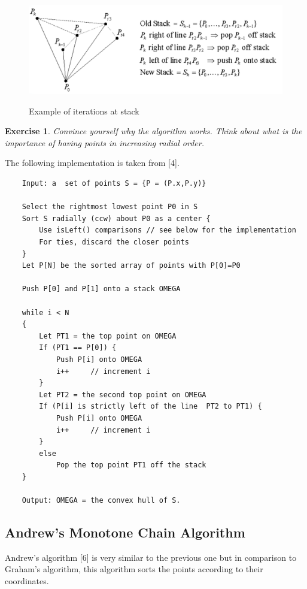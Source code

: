 \documentclass[12pt]{article}
\newtheorem{exercise}{Exercise}[section]
\begin{document}
\begin{center}
  \begin{figure}[!htb]
    \centering
    \includegraphics[width=.85\linewidth]{figures/fig15.png}
    \label{fig:16}
    \caption{Example of iterations at stack}
  \end{figure}
\end{center}

\begin{exercise}
  Convince yourself why the algorithm works. 
  Think about what is the importance of having points in increasing radial order.
\end{exercise}

The following implementation is taken from [4].
\begin{lstlisting}
    Input: a  set of points S = {P = (P.x,P.y)}

    Select the rightmost lowest point P0 in S
    Sort S radially (ccw) about P0 as a center {
        Use isLeft() comparisons // see below for the implementation
        For ties, discard the closer points
    }
    Let P[N] be the sorted array of points with P[0]=P0

    Push P[0] and P[1] onto a stack OMEGA

    while i < N
    {
        Let PT1 = the top point on OMEGA
        If (PT1 == P[0]) {
            Push P[i] onto OMEGA
            i++     // increment i
        }
        Let PT2 = the second top point on OMEGA
        If (P[i] is strictly left of the line  PT2 to PT1) { 
            Push P[i] onto OMEGA
            i++     // increment i
        }
        else
            Pop the top point PT1 off the stack
    }

    Output: OMEGA = the convex hull of S.
\end{lstlisting}

\subsection{Andrew's Monotone Chain Algorithm}

Andrew's algorithm [6] is very similar to the previous one but in comparison to 
Graham's algorithm, this algorithm sorts the points according to their coordinates.
\end{document}
